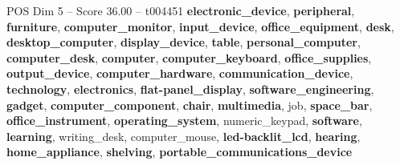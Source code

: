 \begin{textsample}{POS Dim 5 – Score 36.00 – t004451}  \label{ex:f5_pos_007}
\textbf{electronic\_device}, \textbf{peripheral}, \textbf{furniture}, \textbf{computer\_monitor}, \textbf{input\_device}, \textbf{office\_equipment}, \textbf{desk}, \textbf{desktop\_computer}, \textbf{display\_device}, \textbf{table}, \textbf{personal\_computer}, \textbf{computer\_desk}, \textbf{computer}, \textbf{computer\_keyboard}, \textbf{office\_supplies}, \textbf{output\_device}, \textbf{computer\_hardware}, \textbf{communication\_device}, \textbf{technology}, \textbf{electronics}, \textbf{flat-panel\_display}, \textbf{software\_engineering}, \textbf{gadget}, \textbf{computer\_component}, \textbf{chair}, \textbf{multimedia}, job, \textbf{space\_bar}, \textbf{office\_instrument}, \textbf{operating\_system}, numeric\_keypad, \textbf{software}, \textbf{learning}, writing\_desk, computer\_mouse, \textbf{led-backlit\_lcd}, \textbf{hearing}, \textbf{home\_appliance}, \textbf{shelving}, \textbf{portable\_communications\_device}

\end{textsample}
